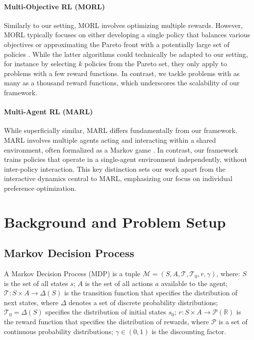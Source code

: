 \documentclass[letterpaper]{article} %
\begin{document}
\paragraph{Multi-Objective RL (MORL)}

Similarly to our setting, MORL involves optimizing multiple rewards. However, MORL typically focuses on either developing a single policy that balances various objectives or approximating the Pareto front with a potentially large set of policies \cite{hayes2022practical}. While the latter algorithms could technically be adapted to our setting, for instance by selecting $k$ policies from the Pareto set, they only apply to problems with a few reward functions. In contrast, we tackle problems with as many as a thousand reward functions, which underscores the scalability of our framework.

\paragraph{Multi-Agent RL (MARL)}

While superficially similar, MARL differs fundamentally from our framework. MARL involves multiple agents acting and interacting within a shared environment, often formalized as a Markov game \cite{littman1994markov}. In contrast, our framework trains policies that operate in a single-agent environment independently, without inter-policy interaction. This key distinction sets our work apart from the interactive dynamics central to MARL, emphasizing our focus on individual preference optimization.





\section{Background and Problem Setup}
\label{sec:problem}


\subsection{Markov Decision Process}
\label{sec:problem_markov}

A Markov Decision Process (MDP) is a tuple $\mathcal{M} = (S, A, \mathcal{T}, \mathcal{T}_0, r, \gamma)$, where: $S$ is the set of all states $s$; $A$ is the set of all actions $a$ available to the agent; $\mathcal{T}: S \times A \rightarrow \Delta(S)$ is the transition function that specifies the distribution of next states, where $\Delta$ denotes a set of discrete probability distributions; $\mathcal{T}_0 = \Delta(S)$ specifies the distribution of initial states $s_0$; $r: S \times A \rightarrow \mathcal{P}(\mathbb{R})$ is the reward function that specifies the distribution of rewards, where $\mathcal{P}$ is a set of continuous probability distributions; $\gamma \in (0, 1)$ is the discounting factor.
\end{document}

